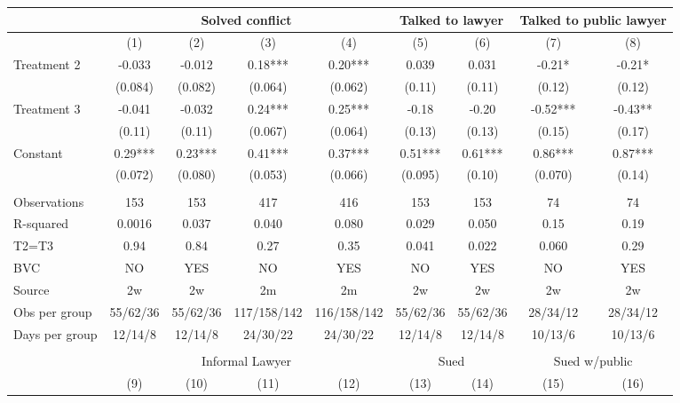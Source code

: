 \begin{tabular}{lcccccccc}
\toprule
      & \multicolumn{4}{c}{Solved conflict} & \multicolumn{2}{c}{Talked to lawyer} & \multicolumn{2}{c}{Talked to public lawyer} \\
\midrule
\midrule
      & (1)   & (2)   & (3)   & (4)   & (5)   & (6)   & (7)   & (8) \\
\midrule
\midrule
Treatment 2 & -0.033 & -0.012 & 0.18*** & 0.20*** & 0.039 & 0.031 & -0.21* & -0.21* \\
      & (0.084) & (0.082) & (0.064) & (0.062) & (0.11) & (0.11) & (0.12) & (0.12) \\
Treatment 3 & -0.041 & -0.032 & 0.24*** & 0.25*** & -0.18 & -0.20 & -0.52*** & -0.43** \\
      & (0.11) & (0.11) & (0.067) & (0.064) & (0.13) & (0.13) & (0.15) & (0.17) \\
Constant  & 0.29*** & 0.23*** & 0.41*** & 0.37*** & 0.51*** & 0.61*** & 0.86*** & 0.87*** \\
      & (0.072) & (0.080) & (0.053) & (0.066) & (0.095) & (0.10) & (0.070) & (0.14) \\
      &       &       &       &       &       &       &       &  \\
\midrule
Observations & 153   & 153   & 417   & 416   & 153   & 153   & 74    & 74 \\
R-squared & 0.0016 & 0.037 & 0.040 & 0.080 & 0.029 & 0.050 & 0.15  & 0.19 \\
T2=T3 & 0.94  & 0.84  & 0.27  & 0.35  & 0.041 & 0.022 & 0.060 & 0.29 \\
BVC   & NO    & YES   & NO    & YES   & NO    & YES   & NO    & YES \\
Source & 2w    & 2w    & 2m    & 2m    & 2w    & 2w    & 2w    & 2w \\
Obs per group & 55/62/36 & 55/62/36 & 117/158/142 & 116/158/142 & 55/62/36 & 55/62/36 & 28/34/12 & 28/34/12 \\
Days per group & 12/14/8 & 12/14/8 & 24/30/22 & 24/30/22 & 12/14/8 & 12/14/8 & 10/13/6 & 10/13/6 \\
\midrule
\midrule
      &       &       &       &       &       &       &       &  \\
\midrule
      & \multicolumn{4}{c}{Informal Lawyer} & \multicolumn{2}{c}{Sued} & \multicolumn{2}{c}{Sued w/public} \\
\midrule
\midrule
      & (9)   & (10)  & (11)  & (12)  & (13)  & (14)  & (15)  & (16) \\

\end{tabular}
